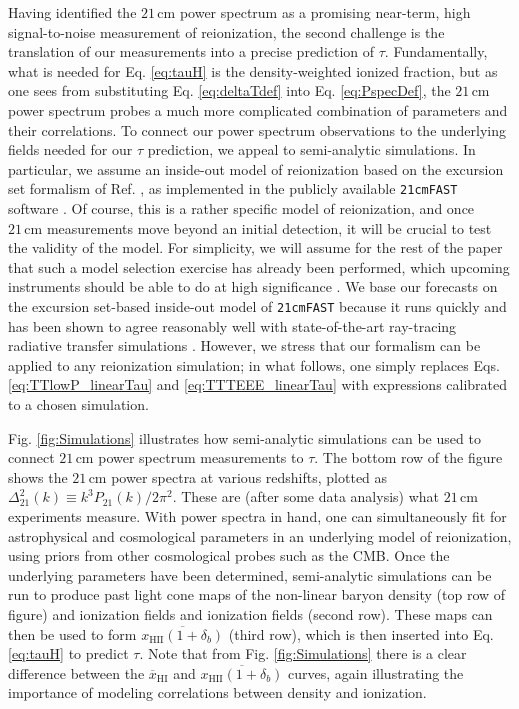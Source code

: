 \documentclass[twocolumn,aps,prd,nofootinbib,showpacs,superscriptaddress]{revtex4-1}
\begin{document}
Having identified the $21\,\textrm{cm}$ power spectrum as a promising near-term, high signal-to-noise measurement of reionization, the second challenge is the translation of our measurements into a precise prediction of $\tau$. Fundamentally, what is needed for Eq. \eqref{eq:tauH} is the density-weighted ionized fraction, but as one sees from substituting Eq. \eqref{eq:deltaTdef} into Eq. \eqref{eq:PspecDef}, the $21\,\textrm{cm}$ power spectrum probes a much more complicated combination of parameters and their correlations. To connect our power spectrum observations to the underlying fields needed for our $\tau$ prediction, we appeal to semi-analytic simulations. In particular, we assume an inside-out model of reionization based on the excursion set formalism of Ref. \cite{furlanetto_et_al2004}, as implemented in the publicly available {\tt 21cmFAST} software \cite{mesinger_et_al2011}. Of course, this is a rather specific model of reionization, and once $21\,\textrm{cm}$ measurements move beyond an initial detection, it will be crucial to test the validity of the model. For simplicity, we will assume for the rest of the paper that such a model selection exercise has already been performed, which upcoming instruments should be able to do at high significance \cite{watkinson_and_pritchard2014}. We base our forecasts on the excursion set-based inside-out model of {\tt 21cmFAST} because it runs quickly and has been shown to agree reasonably well with state-of-the-art ray-tracing radiative transfer simulations \cite{zahn_et_al2011}. However, we stress that our formalism can be applied to any reionization simulation; in what follows, one simply replaces Eqs. \eqref{eq:TTlowP_linearTau} and \eqref{eq:TTTEEE_linearTau} with expressions calibrated to a chosen simulation.

Fig. \ref{fig:Simulations} illustrates how semi-analytic simulations can be used to connect $21\,\textrm{cm}$ power spectrum measurements to $\tau$. The bottom row of the figure shows the $21\,\textrm{cm}$ power spectra at various redshifts, plotted as $\Delta^2_{21} (k) \equiv k^3 P_{21}(k) / 2 \pi^2$. These are (after some data analysis) what $21\,\textrm{cm}$ experiments measure. With power spectra in hand, one can simultaneously fit for astrophysical and cosmological parameters in an underlying model of reionization, using priors from other cosmological probes such as the CMB. Once the underlying parameters have been determined, semi-analytic simulations can be run to produce past light cone maps of the non-linear baryon density (top row of figure) and ionization fields and ionization fields (second row). These maps can then be used to form $\overline{x_\textrm{HII} (1+ \delta_b)}$ (third row), which is then inserted into Eq. \eqref{eq:tauH} to predict $\tau$. Note that from Fig. \ref{fig:Simulations} there is a clear difference between the $\overline{x}_\textrm{HI}$ and $\overline{x_\textrm{HII} (1+ \delta_b)}$ curves, again illustrating the importance of modeling correlations between density and ionization.
\end{document}
